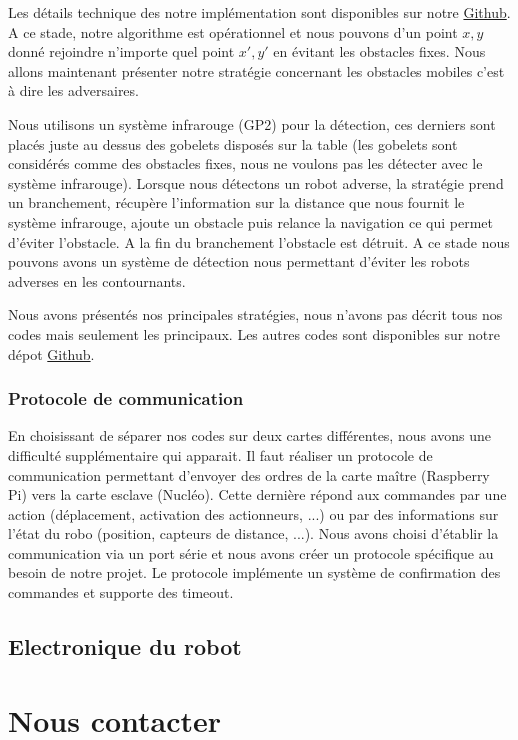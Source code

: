 \documentclass[a4paper,10pt]{article}
\begin{document}
\begin{spacing}{1.5}
Les détails technique des notre implémentation sont disponibles sur notre
\href{https://github.com/eirbot/eirbot2020-1A/blob/master/code/rasp/src/navigation.cpp}{Github}.
A ce stade, notre algorithme est opérationnel et nous pouvons d'un point $x,y$
donné rejoindre n'importe quel point $x',y'$ en évitant les obstacles fixes.
Nous allons maintenant présenter notre stratégie concernant les obstacles
mobiles c'est à dire les adversaires.

Nous utilisons un système infrarouge (GP2) pour la détection, ces derniers sont
placés juste au dessus des gobelets disposés sur la table (les gobelets sont
considérés comme des obstacles fixes, nous ne voulons pas les détecter avec le
système infrarouge). Lorsque nous détectons un robot adverse, la stratégie prend
un branchement, récupère l'information sur la distance que nous fournit le
système infrarouge, ajoute un obstacle puis relance la navigation ce qui permet d'éviter l'obstacle.
A la fin du branchement l'obstacle est détruit. A ce stade nous pouvons avons un
système de détection nous permettant d'éviter les robots adverses en les
contournants.

Nous avons présentés nos principales stratégies, nous n'avons pas décrit tous
nos codes mais seulement les principaux. Les autres codes sont disponibles sur
notre dépot \href{https://github.com/eirbot/eirbot2020-1A}{Github}.

\subsubsection{Protocole de communication}
En choisissant de séparer nos codes sur deux cartes différentes, nous avons une
difficulté supplémentaire qui apparait. Il faut réaliser un protocole de
communication permettant d'envoyer des ordres de la carte maître (Raspberry
Pi) vers la carte esclave (Nucléo). Cette dernière répond aux commandes par une
action (déplacement, activation des actionneurs, ...) ou par des
informations sur l'état du robo (position, capteurs de distance, ...). Nous
avons choisi d'établir la communication via un port série et nous avons créer un
protocole spécifique au besoin de notre projet. Le protocole implémente un
système de confirmation des commandes et supporte des timeout.


\subsection{Electronique du robot}

\newpage
\section{Nous contacter}

\newpage
\end{spacing}
\end{document}
